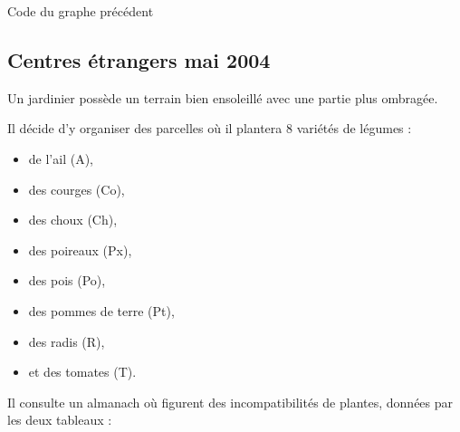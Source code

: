 \vfill\newpage
Code du graphe précédent

\bigskip
\begin{tkzexample}
\end{tkzexample}

\vfill\newpage
\subsection{Centres étrangers  mai 2004 }\label{cem04} 

\bigskip
Un jardinier possède un terrain bien ensoleillé avec une partie plus ombragée.

Il décide d'y organiser des parcelles où il plantera 8 variétés de légumes :

\medskip
\begin{center}\begin{minipage}[t]{0.48\textwidth}
    \begin{itemize}
    \item de l'ail (A),
    \item des courges (Co),
    \item des choux (Ch),
    \item des poireaux (Px),
    \item des pois (Po),
    \item des pommes de terre (Pt),
    \item des radis (R),
    \item et des tomates (T).
    \end{itemize}
\end{minipage}\end{center}

\medskip
Il consulte un almanach où figurent des incompatibilités de plantes, données par les deux tableaux :

